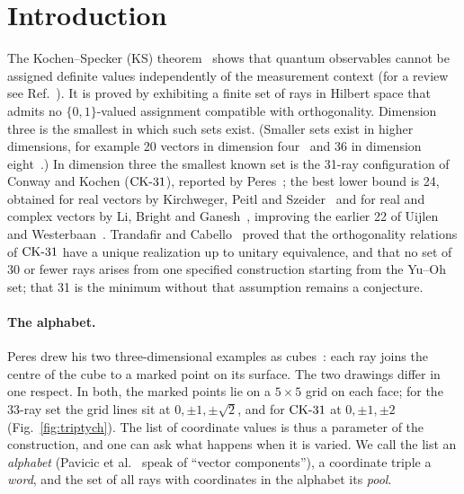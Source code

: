 \section{Introduction}

The Kochen--Specker (KS) theorem~\cite{KochenSpecker1967} shows that quantum observables cannot
be assigned definite values independently of the measurement context (for a review see
Ref.~\cite{Budroni2022}).  It is proved by exhibiting a finite set of rays in Hilbert space that
admits no $\{0,1\}$-valued assignment compatible with orthogonality.  Dimension three is the
smallest in which such sets exist.  (Smaller sets exist in higher dimensions, for example 20
vectors in dimension four~\cite{Kernaghan1994} and 36 in dimension
eight~\cite{KernaghanPeres1995}.)  In dimension three the smallest known set is the 31-ray
configuration of Conway and Kochen ($\mathrm{CK}\text{-}31$), reported by Peres~\cite{Peres1993}; the best lower
bound is 24, obtained for real vectors by Kirchweger, Peitl and
Szeider~\cite{KirchwegerPeitlSzeider2023} and for real and complex vectors by Li, Bright and
Ganesh~\cite{LiBrightGanesh2024}, improving the earlier 22 of Uijlen and
Westerbaan~\cite{UijlenWesterbaan2016}.  Trandafir and Cabello~\cite{TrandafirCabello2025} proved
that the orthogonality relations of $\mathrm{CK}\text{-}31$ have a unique realization up to unitary equivalence,
and that no set of 30 or fewer rays arises from one specified construction starting from the
Yu--Oh set; that 31 is the minimum without that assumption remains a conjecture.

\paragraph{The alphabet.}
Peres drew his two three-dimensional examples as cubes~\cite{Peres1991,Peres1993}: each ray joins
the centre of the cube to a marked point on its surface.  The two drawings differ in one respect.
In both, the marked points lie on a $5\times5$ grid on each face; for the 33-ray set the grid
lines sit at $0,\pm1,\pm\sqrt2$, and for $\mathrm{CK}\text{-}31$ at $0,\pm1,\pm2$ (Fig.~\ref{fig:triptych}).  The
list of coordinate values is thus a parameter of the construction, and one can ask what happens
when it is varied.  We call the list an \emph{alphabet} (Pavicic et
al.~\cite{Pavicic2019} speak of ``vector components''), a coordinate triple a \emph{word}, and the
set of all rays with coordinates in the alphabet its \emph{pool}.

